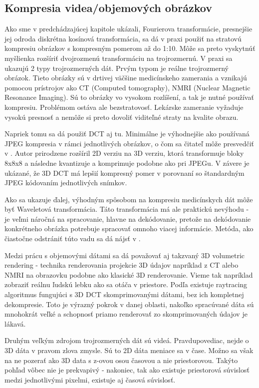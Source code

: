 \subsection{Kompresia videa/objemových obrázkov}

Ako sme v predchádzajúcej kapitole ukázali, Fourierova transformácie,
presnejšie jej odroda diskrétna kosínová transformácia, sa dá v praxi
použiť na stratovú kompresiu obrázkov s kompresným pomerom až do 1:10.
Môže sa preto vyskytnúť myšlienka rozšíriť dvojrozmenú transformáciu
na trojrozmernú.
V praxi sa ukazujú 2 typy trojrozmerných dát.
Prvým typom je reálne trojrozmerný obrázok. Tieto obrázky sú v drtivej
väčšine medicínskeho zamerania a vznikajú pomocou prístrojov ako CT
(Computed tomography), NMRI (Nuclear Magnetic Resonance Imaging).
Sú to obrázky vo vysokom rozlíšení, a tak je nutné používať kompresiu.
Problémom ostáva ale bezstratovosť. Lekárske zameranie vyžaduje vysokú
presnosť a nemôže si preto dovoliť viditeľné straty na kvalite obrazu.

Napriek tomu sa dá použiť DCT aj tu. Minimálne je výhodnejšie ako
používaná JPEG kompresia v rámci jednotlivých obrázkov, o čom sa
čitateľ môže presvedčiť v \cite{medical_dct}. 
Autor prirodzene rozšíril 2D verziu na 3D verziu, 
ktorá transformuje bloky 8x8x8 a následne kvantizuje a komprimuje
podobne ako pri JPEGu. V závere je ukázané, že 3D DCT má lepšií
kompresný pomer v porovnaní so štandardným JPEG kódovaním jednotlivých
snímkov.

Ako sa ukazuje ďalej, výhodným spôsobom na kompresiu medicínskych dát
môže byť Waveletová transformácia. Táto transformácia má ale praktickú
nevýhodu - je veľmi náročná na spracovanie, hlavne na dekódovanie,
pretože na dekódovanie konkrétneho obrázka potrebuje spracovať omnoho
viacej informácie. Metóda, ako čiastočne odstrániť túto vadu sa dá
nájsť v \cite{wavelet3d}.

Medzi prácu s objemovými dátami sa dá považovať aj takzvaný 3D volumetric
rendering - technika renderovania projekcie 3D údajov napríklad z CT
alebo NMRI na obrazovku podobne ako klasické 3D renderovanie. Vieme
tak napríklad zobraziť reálnu ľudskú lebku ako sa otáča v priestore.
Podľa \cite{volumdct} existuje raytracing algoritmus fungujúci s 3D DCT
skomprimovanými dátami, bez ich kompletnej dekompresie.
Toto je výrazný pokrok v danej oblasti, nakoľko spracúvané dáta sú
mnohokrát veľké a schopnosť priamo renderovať zo skomprimovaných
údajov je lákavá.

Druhým veľkým zdrojom trojrozmerných dát sú videá. Pravdupovediac,
nejde o 3D dáta v pravom zlova zmysle. Sú to 2D dáta meniace sa v
čase. Možno sa však na ne pozerať ako 3D data s z-ovou osou časovou a
nie priestorovou. Takýto pohľad vôbec nie je prekvapivý - nakoniec,
tak ako existuje priestorová súvislosť medzi jednotlivými pixelmi,
existuje aj časová súvislosť.

